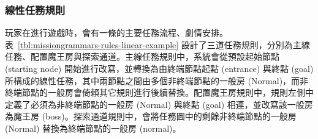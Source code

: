 \subsubsection{線性任務規則}
\label{sssec:method-missiongrammars-rules-linearrules}

玩家在進行遊戲時，會有一條的主要任務流程、劇情安排。表~\ref{tbl:missiongrammars-rules-linear-example} 設計了三道任務規則，分別為主線任務、配置魔王房與探索通道。主線任務規則中，系統會從預設起始節點 (starting node) 開始進行改寫，並轉換為由終端節點起點 (entrance) 與終點 (goal) 所構成的線性任務，其中兩節點之間由多個非終端節點的一般房 (Normal)，而非終端節點的一般房會倚賴其它規則進行後續替換。配置魔王房規則中，規則左側中定義了必須為非終端節點的一般房 (Normal) 與終點 (goal) 相連，並改寫該一般房為魔王房 (boss)。探索通道規則中，會將任務圖中的剩餘非終端節點的一般房 (Normal) 替換為終端節點的一般房 (normal)。

